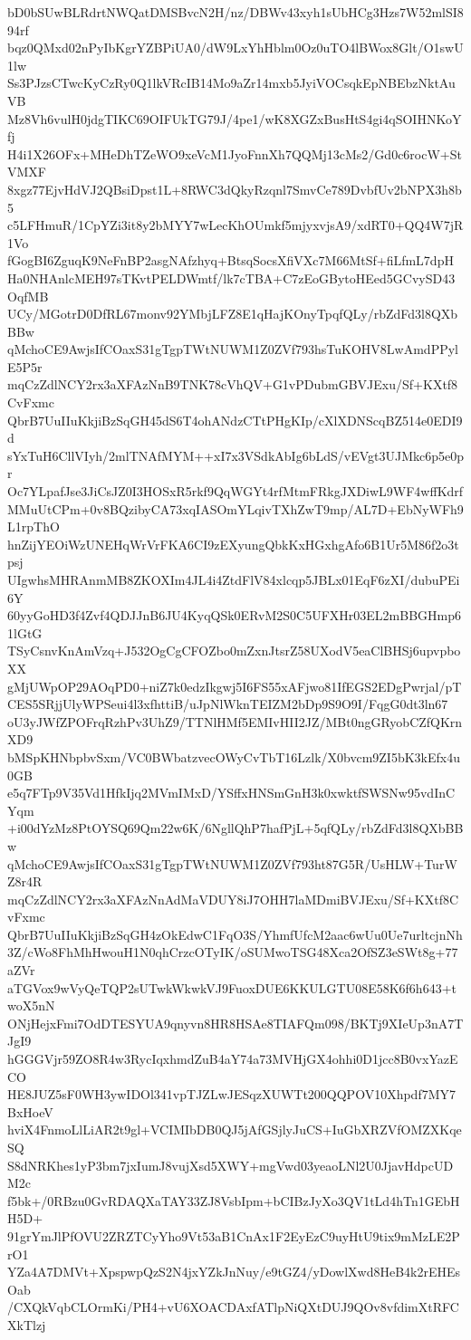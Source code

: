 bD0bSUwBLRdrtNWQatDMSBvcN2H/nz/DBWv43xyh1sUbHCg3Hzs7W52mlSI894rf
bqz0QMxd02nPyIbKgrYZBPiUA0/dW9LxYhHblm0Oz0uTO4lBWox8Glt/O1swU1lw
Ss3PJzsCTwcKyCzRy0Q1lkVRcIB14Mo9aZr14mxb5JyiVOCsqkEpNBEbzNktAuVB
Mz8Vh6vulH0jdgTIKC69OIFUkTG79J/4pe1/wK8XGZxBusHtS4gi4qSOIHNKoYfj
H4i1X26OFx+MHeDhTZeWO9xeVcM1JyoFnnXh7QQMj13cMs2/Gd0c6rocW+StVMXF
8xgz77EjvHdVJ2QBsiDpst1L+8RWC3dQkyRzqnl7SmvCe789DvbfUv2bNPX3h8b5
c5LFHmuR/1CpYZi3it8y2bMYY7wLecKhOUmkf5mjyxvjsA9/xdRT0+QQ4W7jR1Vo
fGogBI6ZguqK9NeFnBP2asgNAfzhyq+BtsqSocsXfiVXc7M66MtSf+fiLfmL7dpH
Ha0NHAnlcMEH97sTKvtPELDWmtf/lk7cTBA+C7zEoGBytoHEed5GCvySD43OqfMB
UCy/MGotrD0DfRL67monv92YMbjLFZ8E1qHajKOnyTpqfQLy/rbZdFd3l8QXbBBw
qMchoCE9AwjsIfCOaxS31gTgpTWtNUWM1Z0ZVf793hsTuKOHV8LwAmdPPylE5P5r
mqCzZdlNCY2rx3aXFAzNnB9TNK78cVhQV+G1vPDubmGBVJExu/Sf+KXtf8CvFxmc
QbrB7UuIIuKkjiBzSqGH45dS6T4ohANdzCTtPHgKIp/cXlXDNScqBZ514e0EDI9d
sYxTuH6CllVIyh/2mlTNAfMYM++xI7x3VSdkAbIg6bLdS/vEVgt3UJMkc6p5e0pr
Oc7YLpafJse3JiCsJZ0I3HOSxR5rkf9QqWGYt4rfMtmFRkgJXDiwL9WF4wffKdrf
MMuUtCPm+0v8BQzibyCA73xqIASOmYLqivTXhZwT9mp/AL7D+EbNyWFh9L1rpThO
hnZijYEOiWzUNEHqWrVrFKA6CI9zEXyungQbkKxHGxhgAfo6B1Ur5M86f2o3tpsj
UIgwhsMHRAnmMB8ZKOXIm4JL4i4ZtdFlV84xlcqp5JBLx01EqF6zXI/dubuPEi6Y
60yyGoHD3f4Zvf4QDJJnB6JU4KyqQSk0ERvM2S0C5UFXHr03EL2mBBGHmp61lGtG
TSyCsnvKnAmVzq+J532OgCgCFOZbo0mZxnJtsrZ58UXodV5eaClBHSj6upvpboXX
gMjUWpOP29AOqPD0+niZ7k0edzIkgwj5I6FS55xAFjwo81IfEGS2EDgPwrjal/pT
CES5SRjjUlyWPSeui4l3xfhttiB/uJpNlWknTEIZM2bDp9S9O9I/FqgG0dt3ln67
oU3yJWfZPOFrqRzhPv3UhZ9/TTNlHMf5EMIvHII2JZ/MBt0ngGRyobCZfQKrnXD9
bMSpKHNbpbvSxm/VC0BWbatzvecOWyCvTbT16Lzlk/X0bvcm9ZI5bK3kEfx4u0GB
e5q7FTp9V35Vd1HfkIjq2MVmIMxD/YSffxHNSmGnH3k0xwktfSWSNw95vdInCYqm
+i00dYzMz8PtOYSQ69Qm22w6K/6NgllQhP7hafPjL+5qfQLy/rbZdFd3l8QXbBBw
qMchoCE9AwjsIfCOaxS31gTgpTWtNUWM1Z0ZVf793ht87G5R/UsHLW+TurWZ8r4R
mqCzZdlNCY2rx3aXFAzNnAdMaVDUY8iJ7OHH7laMDmiBVJExu/Sf+KXtf8CvFxmc
QbrB7UuIIuKkjiBzSqGH4zOkEdwC1FqO3S/YhmfUfcM2aac6wUu0Ue7urltcjnNh
3Z/cWo8FhMhHwouH1N0qhCrzcOTyIK/oSUMwoTSG48Xca2OfSZ3eSWt8g+77aZVr
aTGVox9wVyQeTQP2sUTwkWkwkVJ9FuoxDUE6KKULGTU08E58K6f6h643+twoX5nN
ONjHejxFmi7OdDTESYUA9qnyvn8HR8HSAe8TIAFQm098/BKTj9XIeUp3nA7TJgI9
hGGGVjr59ZO8R4w3RycIqxhmdZuB4aY74a73MVHjGX4ohhi0D1jcc8B0vxYazECO
HE8JUZ5sF0WH3ywIDOl341vpTJZLwJESqzXUWTt200QQPOV10Xhpdf7MY7BxHoeV
hviX4FnmoLlLiAR2t9gl+VCIMIbDB0QJ5jAfGSjlyJuCS+IuGbXRZVfOMZXKqeSQ
S8dNRKhes1yP3bm7jxIumJ8vujXsd5XWY+mgVwd03yeaoLNl2U0JjavHdpcUDM2c
f5bk+/0RBzu0GvRDAQXaTAY33ZJ8VsbIpm+bCIBzJyXo3QV1tLd4hTn1GEbHH5D+
91grYmJlPfOVU2ZRZTCyYho9Vt53aB1CnAx1F2EyEzC9uyHtU9tix9mMzLE2PrO1
YZa4A7DMVt+XpspwpQzS2N4jxYZkJnNuy/e9tGZ4/yDowlXwd8HeB4k2rEHEsOab
/CXQkVqbCLOrmKi/PH4+vU6XOACDAxfATlpNiQXtDUJ9QOv8vfdimXtRFCXkTlzj
